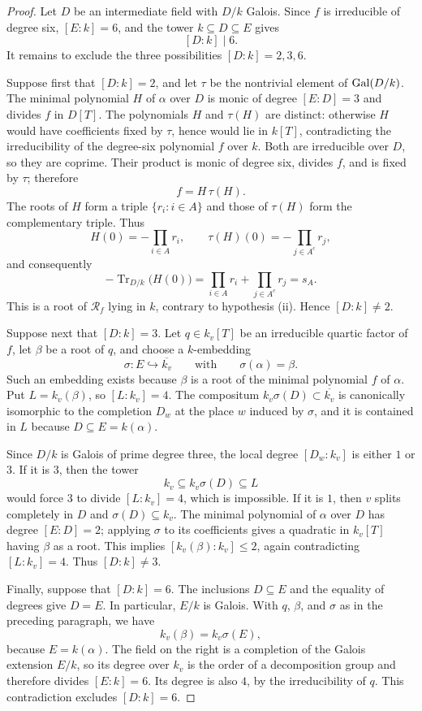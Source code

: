 \begin{proof}
Let $D$ be an intermediate field with $D/k$ Galois.  Since $f$ is
irreducible of degree six,
$[E:k]=6$, and the tower $k\subseteq D\subseteq E$ gives
\[
 [D:k]\mid6.
\]
It remains to exclude the three possibilities $[D:k]=2,3,6$.

Suppose first that $[D:k]=2$, and let $\tau$ be the nontrivial element
of $\operatorname{Gal}(D/k)$.  The minimal polynomial $H$ of $\alpha$ over $D$ is
monic of degree $[E:D]=3$ and divides $f$ in $D[T]$.  The polynomials
$H$ and $\tau(H)$ are distinct: otherwise $H$ would have coefficients
fixed by $\tau$, hence would lie in $k[T]$, contradicting the
irreducibility of the degree-six polynomial $f$ over $k$.  Both are
irreducible over $D$, so they are coprime.  Their product is monic of
degree six, divides $f$, and is fixed by $\tau$; therefore
\[
 f=H\,\tau(H).
\]
The roots of $H$ form a triple $\{r_i:i\in A\}$ and those of
$\tau(H)$ form the complementary triple.  Thus
\[
 H(0)=-\prod_{i\in A}r_i,
 \qquad
 \tau(H)(0)=-\prod_{j\in A^c}r_j,
\]
and consequently
\[
 -\operatorname{Tr}_{D/k}\bigl(H(0)\bigr)
 =\prod_{i\in A}r_i+\prod_{j\in A^c}r_j
 =s_A.
\]
This is a root of $\mathcal R_f$ lying in $k$, contrary to hypothesis
\textup{(ii)}.  Hence $[D:k]\ne2$.

Suppose next that $[D:k]=3$.  Let $q\in k_v[T]$ be an irreducible
quartic factor of $f$, let $\beta$ be a root of $q$, and choose a
$k$-embedding
\[
 \sigma:E\hookrightarrow\overline{k_v}
 \qquad\text{with}\qquad
 \sigma(\alpha)=\beta.
\]
Such an embedding exists because $\beta$ is a root of the minimal
polynomial $f$ of $\alpha$.  Put $L=k_v(\beta)$, so $[L:k_v]=4$.
The compositum $k_v\sigma(D)\subset\overline{k_v}$ is canonically
isomorphic to the completion $D_w$ at the place $w$ induced by
$\sigma$, and it is contained in $L$ because $D\subseteq E=k(\alpha)$.

Since $D/k$ is Galois of prime degree three, the local degree
$[D_w:k_v]$ is either $1$ or $3$.  If it is $3$, then the tower
\[
 k_v\subseteq k_v\sigma(D)\subseteq L
\]
would force $3$ to divide $[L:k_v]=4$, which is impossible.  If it is
$1$, then $v$ splits completely in $D$ and $\sigma(D)\subseteq k_v$.
The minimal polynomial of $\alpha$ over $D$ has degree
$[E:D]=2$; applying $\sigma$ to its coefficients gives a quadratic in
$k_v[T]$ having $\beta$ as a root.  This implies
$[k_v(\beta):k_v]\leq2$, again contradicting $[L:k_v]=4$.  Thus
$[D:k]\ne3$.

Finally, suppose that $[D:k]=6$.  The inclusions $D\subseteq E$ and
the equality of degrees give $D=E$.  In particular, $E/k$ is Galois.
With $q$, $\beta$, and $\sigma$ as in the preceding paragraph,
we have
\[
 k_v(\beta)=k_v\sigma(E),
\]
because $E=k(\alpha)$.  The field on the right is a completion of the
Galois extension $E/k$, so its degree over $k_v$ is the order of a
decomposition group and therefore divides $[E:k]=6$.  Its degree is
also $4$, by the irreducibility of $q$.  This contradiction excludes
$[D:k]=6$.


\end{proof}
